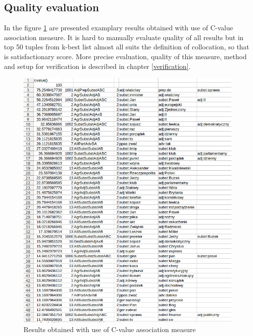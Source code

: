 \subsection{Quality evaluation}
In the figure \ref{img_cval} are presented examplary results obtained with use of C-value association measure. 
It is hard to manually evaluate quality of all results but in top 50 tuples from k-best list almost all suits the definition of collocation, 
so that is satisfactionary score. More precise evaluation, quality of this measure, method and setup for verification 
is described in chapter \ref{verification}.
\begin{figure}[ht]
    \centering
    \includegraphics[scale=0.45]{img/cval_res.png}
    \caption{Results obtained with use of C-value association measure}
    \label{img_cval}
\end{figure}
